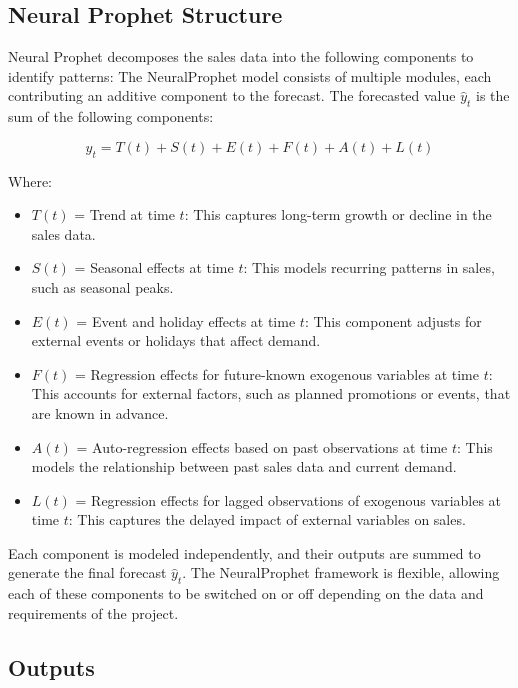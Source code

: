 \subsection{Neural Prophet Structure}

Neural Prophet decomposes the sales data into the following components to identify patterns:
The NeuralProphet model consists of multiple modules, each contributing an additive component to the forecast. The forecasted value \( \hat{y}_t \) is the sum of the following components:

\begin{equation}
    \hat{y}_t = T(t) + S(t) + E(t) + F(t) + A(t) + L(t)
\end{equation}

Where:
\begin{itemize}
    \item \( T(t) \) = Trend at time \( t \): This captures long-term growth or decline in the sales data.
    \item \( S(t) \) = Seasonal effects at time \( t \): This models recurring patterns in sales, such as seasonal peaks.
    \item \( E(t) \) = Event and holiday effects at time \( t \): This component adjusts for external events or holidays that affect demand.
    \item \( F(t) \) = Regression effects for future-known exogenous variables at time \( t \): This accounts for external factors, such as planned promotions or events, that are known in advance.
    \item \( A(t) \) = Auto-regression effects based on past observations at time \( t \): This models the relationship between past sales data and current demand.
    \item \( L(t) \) = Regression effects for lagged observations of exogenous variables at time \( t \): This captures the delayed impact of external variables on sales.
\end{itemize}

Each component is modeled independently, and their outputs are summed to generate the final forecast \( \hat{y}_t \). The NeuralProphet framework is flexible, allowing each of these components to be switched on or off depending on the data and requirements of the project.

\subsection{Outputs}

